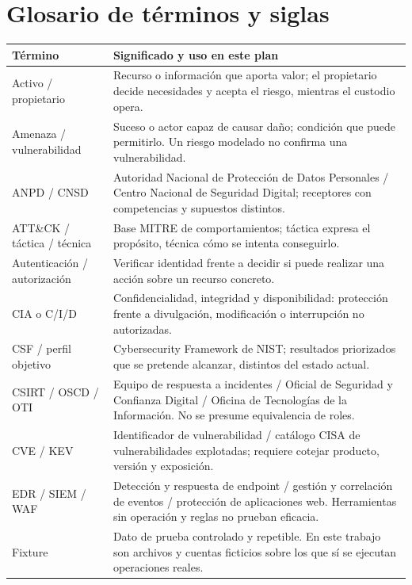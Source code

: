 \documentclass[10pt,a4paper]{article}
\newcommand{\cabecera}[1]{\textbf{#1}}
\begin{document}
\clearpage
\section*{Glosario de términos y siglas}
\begin{TablaCompacta}
\begin{longtable}{P{35mm}P{124mm}}
\toprule\cabecera{Término} & \cabecera{Significado y uso en este plan}\\\midrule\endhead
Activo / propietario & Recurso o información que aporta valor; el propietario decide necesidades y acepta el riesgo, mientras el custodio opera.\\
Amenaza / vulnerabilidad & Suceso o actor capaz de causar daño; condición que puede permitirlo. Un riesgo modelado no confirma una vulnerabilidad.\\
ANPD / CNSD & Autoridad Nacional de Protección de Datos Personales / Centro Nacional de Seguridad Digital; receptores con competencias y supuestos distintos.\\
ATT\&CK / táctica / técnica & Base MITRE de comportamientos; táctica expresa el propósito, técnica cómo se intenta conseguirlo.\\
Autenticación / autorización & Verificar identidad frente a decidir si puede realizar una acción sobre un recurso concreto.\\
CIA o C/I/D & Confidencialidad, integridad y disponibilidad: protección frente a divulgación, modificación o interrupción no autorizadas.\\
CSF / perfil objetivo & Cybersecurity Framework de NIST; resultados priorizados que se pretende alcanzar, distintos del estado actual.\\
CSIRT / OSCD / OTI & Equipo de respuesta a incidentes / Oficial de Seguridad y Confianza Digital / Oficina de Tecnologías de la Información. No se presume equivalencia de roles.\\
CVE / KEV & Identificador de vulnerabilidad / catálogo CISA de vulnerabilidades explotadas; requiere cotejar producto, versión y exposición.\\
EDR / SIEM / WAF & Detección y respuesta de endpoint / gestión y correlación de eventos / protección de aplicaciones web. Herramientas sin operación y reglas no prueban eficacia.\\
Fixture & Dato de prueba controlado y repetible. En este trabajo son archivos y cuentas ficticios sobre los que sí se ejecutan operaciones reales.\\

\end{longtable}
\end{TablaCompacta}
\end{document}

